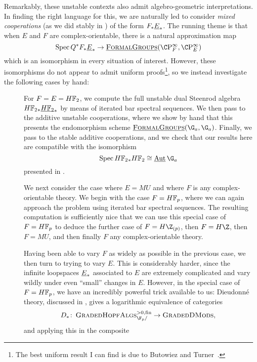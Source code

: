 Remarkably, these unstable contexts also admit algebro-geometric interpretations.  In finding the right language for this, we are naturally led to consider \textit{mixed cooperations} (as we did stably in ) of the form \(F_* \OS{E}{*}\).  The running theme is that when \(E\) and \(F\) are complex-orientable, there is a natural approximation map \[\Spec Q^* F_* \OS{E}{*} \to \InternalHom{FormalGroups}(\CP^\infty_F, \CP^\infty_E)\] which is an isomorphism in every situation of interest.  However, these isomorphisms do not appear to admit uniform proofs\footnote{The best uniform result I can find is due to Butowiez and Turner~\cite[Theorem 3.12]{ButowiezTurner}.}, so we instead investigate the following cases by hand:
\begin{description}
\item[{}] For \(F = E = \HFtwo\), we compute the full unstable dual Steenrod algebra \(\HFtwo_* \OS{\HFtwo}{*}\) by means of iterated bar spectral sequences.  We then pass to the additive unstable cooperations, where we show by hand that this presents the endomorphism scheme \(\InternalHom{FormalGroups}(\G_a, \G_a)\).  Finally, we pass to the stable additive cooperations, and we check that our results here are compatible with the isomorphism \[\Spec \HFtwo_* \HFtwo \cong \InternalAut{\G_a}\] presented in .
\item[{}] We next consider the case where \(E = MU\) and where \(F\) is any complex-orientable theory.  We begin with the case \(F = \HFp\), where we can again approach the problem using iterated bar spectral sequences.  The resulting computation is sufficiently nice that we can use this special case of \(F = \HFp\) to deduce the further case of \(F = H\Z_{(p)}\), then \(F = H\Z\), then \(F = MU\), and then finally \(F\) any complex-orientable theory.
\item[{}] Having been able to vary \(F\) as widely as possible in the previous case, we then turn to trying to vary \(E\).  This is considerably harder, since the infinite loopspaces \(\OS{E}{*}\) associated to \(E\) are extremely complicated and vary wildly under even ``small'' changes in \(E\).  However, in the special case of \(F = \HFp\), we have an incredibly powerful trick available to us: Dieudonn\'e theory, discussed in , gives a logarithmic equivalence of categories \[D_*\co \CatOf{GradedHopfAlgs}^{> 0, \fin}_{\F_p/} \to \CatOf{GradedDMods},\] and applying this in the composite

\end{description}
